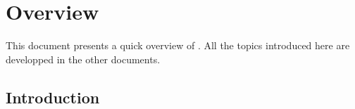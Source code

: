 

\newcommand{\mantitle}{\textsc{Overview} }


\tableofcontents

\newcommand{\bigcaps}[1]{\uppercase{#1}}


\newcommand{\bii}{\\}
\newcommand{\eii}{\\\\}
\newcommand{\oidx}{\emph{oid}}
\newcommand{\oid}{{\oidx} }
\newcommand{\class}[1]{class \texttt{#1}}
\newcommand{\instance}[1]{instance of the \class{#1}}
\newcommand{\instances}[1]{instances of the \class{#1}}

\chapter{Overview}


This document presents a quick overview of \eyedbX. All the topics introduced
here are developped in the other documents.

\section{Introduction}

